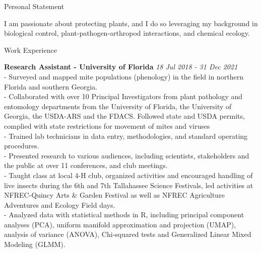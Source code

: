 \documentclass{resume} %
\begin{document}
\begin{rSection}{Personal Statement}
	
I am passionate about protecting plants, and I do so leveraging my background in biological control, plant-pathogen-arthropod interactions, and chemical ecology. \end{rSection}

\begin{rSection}{Work Experience}
	
	\textbf{Research Assistant - University of Florida} \hfill {\em \textit{18 Jul 2018 - 31 Dec 2021}}\\
- Surveyed and mapped mite populations (phenology) in the field in northern Florida and southern Georgia.\\
- Collaborated with over 10 Principal Investigators from plant pathology and entomology departments from the University of Florida, the University of Georgia, the USDA-ARS and the FDACS. Followed state and USDA permits, complied with state restrictions for movement of mites and viruses\\
 - Trained lab technicians in data entry, methodologies, and standard operating procedures.\\
 - Presented research to various audiences, including scientists, stakeholders and the public at over 11 conferences, and club meetings.\\
 - Taught class at local 4-H club, organized activities and encouraged handling of live insects during the 6th and 7th Tallahassee Science Festivals, led activities at NFREC-Quincy Arts \& Garden Festival as well as NFREC Agriculture Adventures and Ecology Field days.\\
 -  Analyzed data with statistical methods in R, including principal component analyses (PCA), uniform manifold approximation and projection (UMAP), analysis of variance (ANOVA), Chi-squared tests and Generalized Linear Mixed Modeling (GLMM). \\


\end{rSection}
\end{document}
